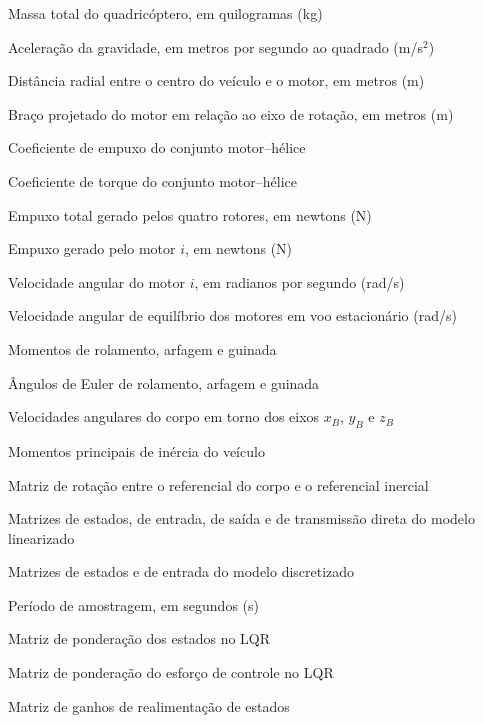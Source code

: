 \begin{simbolos}
    \item[$m$, $M$] Massa total do quadricóptero, em quilogramas (kg)
    \item[$g$] Aceleração da gravidade, em metros por segundo ao quadrado (m/s$^2$)
    \item[$l$] Distância radial entre o centro do veículo e o motor, em metros (m)
    \item[$d$] Braço projetado do motor em relação ao eixo de rotação, em metros (m)
    \item[$K_t$] Coeficiente de empuxo do conjunto motor--hélice
    \item[$K_q$] Coeficiente de torque do conjunto motor--hélice
    \item[$T$] Empuxo total gerado pelos quatro rotores, em newtons (N)
    \item[$F_i$] Empuxo gerado pelo motor $i$, em newtons (N)
    \item[$\omega_i$] Velocidade angular do motor $i$, em radianos por segundo (rad/s)
    \item[$\omega_0$] Velocidade angular de equilíbrio dos motores em voo estacionário (rad/s)
    \item[$\tau_\phi,\tau_\theta,\tau_\psi$] Momentos de rolamento, arfagem e guinada
    \item[$\phi,\theta,\psi$] Ângulos de Euler de rolamento, arfagem e guinada
    \item[$p,q,r$] Velocidades angulares do corpo em torno dos eixos $x_B$, $y_B$ e $z_B$
    \item[$I_{xx},I_{yy},I_{zz}$] Momentos principais de inércia do veículo
    \item[$\mathbf{R}$] Matriz de rotação entre o referencial do corpo e o referencial inercial
    \item[$\mathbf{A},\mathbf{B},\mathbf{C},\mathbf{D}$] Matrizes de estados, de entrada, de saída e de transmissão direta do modelo linearizado
    \item[$\mathbf{A}_d,\mathbf{B}_d$] Matrizes de estados e de entrada do modelo discretizado
    \item[$T_s$] Período de amostragem, em segundos (s)
    \item[$\mathbf{Q}$] Matriz de ponderação dos estados no LQR
    \item[$\mathbf{R}_{\mathrm{lqr}}$] Matriz de ponderação do esforço de controle no LQR
    \item[$\mathbf{K}$] Matriz de ganhos de realimentação de estados

\end{simbolos}
